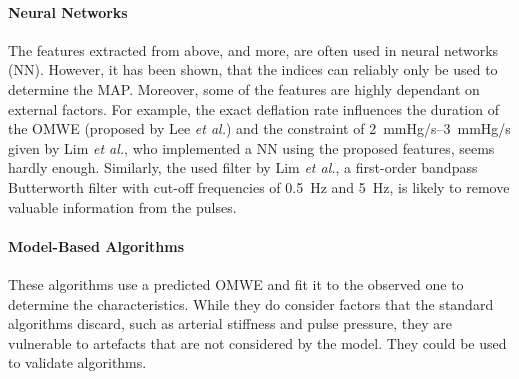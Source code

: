 \paragraph{Neural Networks} The features extracted from above, and more, are often used in neural networks (NN). However, it has been shown, that the indices can reliably only be used to determine the MAP. Moreover, some of the features are highly dependant on external factors. For example, the exact deflation rate influences the duration of the OMWE (proposed by Lee \textit{et al.}\cite{Lee2013}) and the constraint of \SIrange{2}{3}{\mmHg/\second} given by Lim \textit{et al.}\cite{Lim2015}, who implemented a NN using the proposed features, seems hardly enough. Similarly, the used filter by Lim \textit{et al.}, a first-order bandpass Butterworth filter with cut-off frequencies of \SI{0.5}{\Hz} and \SI{5}{\Hz}, is likely to remove valuable information from the pulses.

\paragraph{Model-Based Algorithms} These algorithms use a predicted OMWE and fit it to the observed one to determine the characteristics. While they do consider factors that the standard algorithms discard, such as arterial stiffness and pulse pressure, they are vulnerable to artefacts that are not considered by the model. They could be used to validate algorithms. \cite{Babbs2012}
